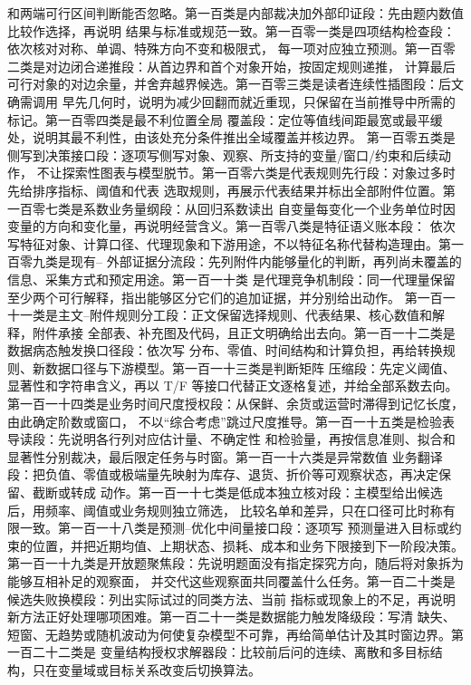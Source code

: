 和两端可行区间判断能否忽略。第一百类是内部裁决加外部印证段：先由题内数值比较作选择，再说明
结果与标准或规范一致。第一百零一类是四项结构检查段：依次核对对称、单调、特殊方向不变和极限式，
每一项对应独立预测。第一百零二类是对边闭合递推段：从首边界和首个对象开始，按固定规则递推，
计算最后可行对象的对边余量，并舍弃越界候选。第一百零三类是读者连续性插图段：后文确需调用
早先几何时，说明为减少回翻而就近重现，只保留在当前推导中所需的标记。第一百零四类是最不利位置全局
覆盖段：定位等值线间距最宽或最平缓处，说明其最不利性，由该处充分条件推出全域覆盖并核边界。
第一百零五类是侧写到决策接口段：逐项写侧写对象、观察、所支持的变量/窗口/约束和后续动作，
不让探索性图表与模型脱节。第一百零六类是代表规则先行段：对象过多时先给排序指标、阈值和代表
选取规则，再展示代表结果并标出全部附件位置。第一百零七类是系数业务量纲段：从回归系数读出
自变量每变化一个业务单位时因变量的方向和变化量，再说明经营含义。第一百零八类是特征语义账本段：
依次写特征对象、计算口径、代理现象和下游用途，不以特征名称代替构造理由。第一百零九类是现有--
外部证据分流段：先列附件内能够量化的判断，再列尚未覆盖的信息、采集方式和预定用途。第一百一十类
是代理竞争机制段：同一代理量保留至少两个可行解释，指出能够区分它们的追加证据，并分别给出动作。
第一百一十一类是主文--附件规则分工段：正文保留选择规则、代表结果、核心数值和解释，附件承接
全部表、补充图及代码，且正文明确给出去向。第一百一十二类是数据病态触发换口径段：依次写
分布、零值、时间结构和计算负担，再给转换规则、新数据口径与下游模型。第一百一十三类是判断矩阵
压缩段：先定义阈值、显著性和字符串含义，再以 T/F 等接口代替正文逐格复述，并给全部系数去向。
第一百一十四类是业务时间尺度授权段：从保鲜、余货或运营时滞得到记忆长度，由此确定阶数或窗口，
不以“综合考虑”跳过尺度推导。第一百一十五类是检验表导读段：先说明各行列对应估计量、不确定性
和检验量，再按信息准则、拟合和显著性分别裁决，最后限定任务与时窗。第一百一十六类是异常数值
业务翻译段：把负值、零值或极端量先映射为库存、退货、折价等可观察状态，再决定保留、截断或转成
动作。第一百一十七类是低成本独立核对段：主模型给出候选后，用频率、阈值或业务规则独立筛选，
比较名单和差异，只在口径可比时称有限一致。第一百一十八类是预测--优化中间量接口段：逐项写
预测量进入目标或约束的位置，并把近期均值、上期状态、损耗、成本和业务下限接到下一阶段决策。
第一百一十九类是开放题聚焦段：先说明题面没有指定探究方向，随后将对象拆为能够互相补足的观察面，
并交代这些观察面共同覆盖什么任务。第一百二十类是候选失败换模段：列出实际试过的同类方法、当前
指标或现象上的不足，再说明新方法正好处理哪项困难。第一百二十一类是数据能力触发降级段：写清
缺失、短窗、无趋势或随机波动为何使复杂模型不可靠，再给简单估计及其时窗边界。第一百二十二类是
变量结构授权求解器段：比较前后问的连续、离散和多目标结构，只在变量域或目标关系改变后切换算法。
